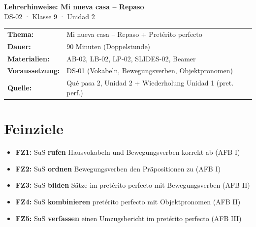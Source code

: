 \documentclass[11pt, a4paper]{article}
\begin{document}

\begin{center}
    {\LARGE\bfseries Lehrerhinweise: Mi nueva casa – Repaso}\\[6pt]
    {\large DS-02 · Klasse 9 · Unidad 2}
\end{center}

\vspace{8pt}


\begin{infobox}[Stundenübersicht]
\begin{tabular}{@{}ll@{}}
\textbf{Thema:} & Mi nueva casa -- Repaso + Pretérito perfecto \\
\textbf{Dauer:} & 90 Minuten (Doppelstunde) \\
\textbf{Materialien:} & AB-02, LB-02, LP-02, SLIDES-02, Beamer \\
\textbf{Voraussetzung:} & DS-01 (Vokabeln, Bewegungsverben, Objektpronomen) \\
\textbf{Quelle:} & Qué pasa 2, Unidad 2 + Wiederholung Unidad 1 (pret. perf.) \\
\end{tabular}
\end{infobox}

\vspace{8pt}


\section*{Feinziele}

\begin{itemize}[leftmargin=1.5em]
    \item \textbf{FZ1:} SuS \textbf{rufen} Hausvokabeln und Bewegungsverben korrekt ab (AFB I)
    \item \textbf{FZ2:} SuS \textbf{ordnen} Bewegungsverben den Präpositionen zu (AFB I)
    \item \textbf{FZ3:} SuS \textbf{bilden} Sätze im pretérito perfecto mit Bewegungsverben (AFB II)
    \item \textbf{FZ4:} SuS \textbf{kombinieren} pretérito perfecto mit Objektpronomen (AFB II)
    \item \textbf{FZ5:} SuS \textbf{verfassen} einen Umzugsbericht im pretérito perfecto (AFB III)
\end{itemize}
\end{document}
